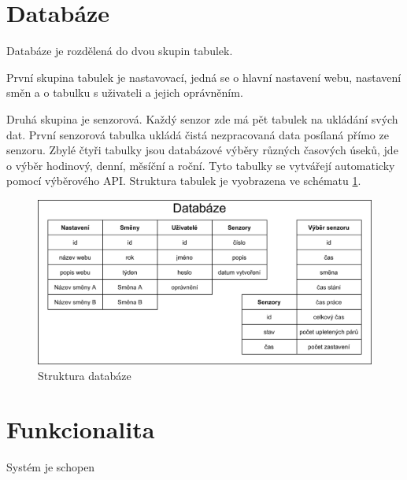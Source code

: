 \section{Databáze}
Databáze je rozdělená do dvou skupin tabulek.

První skupina tabulek je nastavovací, jedná se o hlavní nastavení webu, nastavení směn a o tabulku s uživateli a jejich oprávněním.

Druhá skupina je senzorová.
Každý senzor zde má pět tabulek na ukládání svých dat.
První senzorová tabulka ukládá čistá nezpracovaná data posílaná přímo ze senzoru.
Zbylé čtyři tabulky jsou databázové výběry různých časových úseků, jde o výběr hodinový, denní, měsíční a roční.  
Tyto tabulky se vytvářejí automaticky pomocí výběrového API. 
Struktura tabulek je vyobrazena ve schématu \ref{fig:databaze}.


\begin{figure}[htbp]
    \centering
    \includegraphics[width=\textwidth]{img/Databaze.png}
    \caption{Struktura databáze}
    \label{fig:databaze}
\end{figure}


\fxnote[author=JPA]{\textcolor{mygreen}{Možná bychom se mohli pobavit o úpravě "Struktura databáze" obrázku.}}



\section{Funkcionalita}

Systém je schopen


\newpage